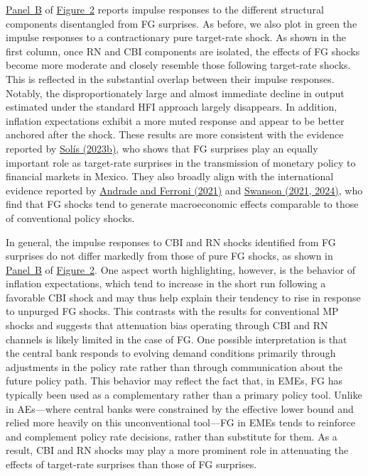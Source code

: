 \documentclass[12pt, reqno]{article}
\begin{document}
\hyperlink{Panel BF1}{Panel~B} of \hyperlink{Figure~2}{Figure~2} reports impulse responses to the different structural components disentangled from FG surprises. As before, we also plot in green the impulse responses to a contractionary pure target-rate shock. As shown in the first column, once RN and CBI components are isolated, the effects of FG shocks become more moderate and closely resemble those following target-rate shocks. This is reflected in the substantial overlap between their impulse responses. Notably, the disproportionately large and almost immediate decline in output estimated under the standard HFI approach largely disappears. In addition, inflation expectations exhibit a more muted response and appear to be better anchored after the shock. These results are more consistent with the evidence reported by \hyperlink{Solis (2023b)}{Solís (2023b)}, who shows that FG surprises play an equally important role as target-rate surprises in the transmission of monetary policy to financial markets in Mexico. They also broadly align with the international evidence reported by \hyperlink{Andrade and Ferroni (2021)}{Andrade and Ferroni (2021)} and \hyperlink{Swanson (2021, 2024)}{Swanson (2021, 2024)}, who find that FG shocks tend to generate macroeconomic effects comparable to those of conventional policy shocks.

In general, the impulse responses to CBI and RN shocks identified from FG surprises do not differ markedly from those of pure FG shocks, as shown in \hyperlink{Panel BF1}{Panel~B} of \hyperlink{Figure~2}{Figure~2}. One aspect worth highlighting, however, is the behavior of inflation expectations, which tend to increase in the short run following a favorable CBI shock and may thus help explain their tendency to rise in response to unpurged FG shocks. This contrasts with the results for conventional MP shocks and suggests that attenuation bias operating through CBI and RN channels is likely limited in the case of FG. One possible interpretation is that the central bank responds to evolving demand conditions primarily through adjustments in the policy rate rather than through communication about the future policy path. This behavior may reflect the fact that, in EMEs, FG has typically been used as a complementary rather than a primary policy tool. Unlike in AEs—where central banks were constrained by the effective lower bound and relied more heavily on this unconventional tool—FG in EMEs tends to reinforce and complement policy rate decisions, rather than substitute for them. As a result, CBI and RN shocks may play a more prominent role in attenuating the effects of target-rate surprises than those of FG surprises.
\end{document}
